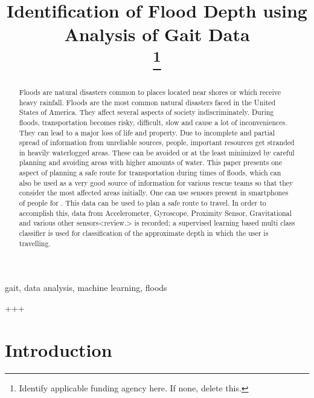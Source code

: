 \documentclass[conference]{IEEEtran}
\begin{document}
\title{Identification of Flood Depth using Analysis of Gait Data\\
\thanks{Identify applicable funding agency here. If none, delete this.}
}

\author{
}

\maketitle

\begin{abstract}
Floods are natural disasters common to places located near shores or which receive heavy rainfall. Floods are the most common natural disasters faced in the United States of America. They affect several aspects of society indiscriminately. During floods, transportation becomes risky, difficult, slow and cause a lot of inconveniences. They can lead to a major loss of life and property. Due to incomplete and partial spread of information from unreliable sources, people, important resources get stranded in heavily waterlogged areas. These can be avoided or at the least minimized by careful planning and avoiding areas with higher amounts of water. This paper presents one aspect of planning a safe route for transportation during times of floods, which can also be used as a very good source of information for various rescue teams so that they consider the most affected areas initially. One can use sensors present in smartphones of people for . This data can be used to plan a safe route to travel. In order to accomplish this, data from  Accelerometer, Gyroscope, Proximity Sensor, Gravitational and various other sensors<review.>  is recorded; a supervised learning based multi class classifier is used for classification of the approximate depth in which the user is travelling. 
\end{abstract}

\begin{IEEEkeywords}
gait, data analysis, machine learning, floods
\end{IEEEkeywords}+++

\section{Introduction}
\end{document}
